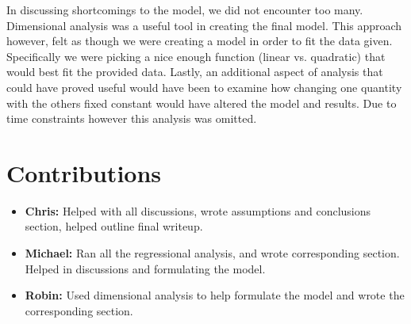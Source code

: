 \documentclass{article}
\begin{document}
In discussing shortcomings to the model, we did not encounter too many. Dimensional analysis was a useful tool in creating the final model. This approach however, felt as though we were creating a model in order to fit the data given. Specifically we were picking a nice enough function (linear vs. quadratic) that would best fit the provided data. Lastly, an additional aspect of analysis that could have proved useful would have been to examine how changing one quantity with the others fixed constant would have altered the model and results. Due to time constraints however this analysis was omitted.

\section*{Contributions}

\begin{itemize}
\item \textbf{Chris:} Helped with all discussions, wrote assumptions and conclusions section,  helped outline final writeup.  

\item \textbf{Michael:} Ran all the regressional analysis, and wrote corresponding section. Helped in discussions and formulating the model.

\item \textbf{Robin:} Used dimensional analysis to help formulate the model and wrote the corresponding section.

\end{itemize}
\newpage
\end{document}
